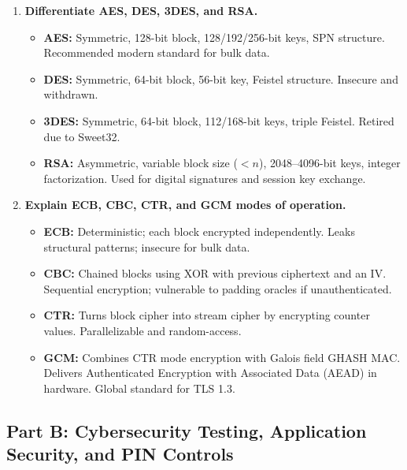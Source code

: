 \begin{enumerate}[label=\textbf{Q\arabic*.},leftmargin=1.2cm]
\item \textbf{Differentiate AES, DES, 3DES, and RSA.}
\begin{itemize}
\item \textbf{AES:} Symmetric, 128-bit block, 128/192/256-bit keys, SPN structure. Recommended modern standard for bulk data.
\item \textbf{DES:} Symmetric, 64-bit block, 56-bit key, Feistel structure. Insecure and withdrawn.
\item \textbf{3DES:} Symmetric, 64-bit block, 112/168-bit keys, triple Feistel. Retired due to Sweet32.
\item \textbf{RSA:} Asymmetric, variable block size ($< n$), 2048--4096-bit keys, integer factorization. Used for digital signatures and session key exchange.
\end{itemize}

\item \textbf{Explain ECB, CBC, CTR, and GCM modes of operation.}
\begin{itemize}
\item \textbf{ECB:} Deterministic; each block encrypted independently. Leaks structural patterns; insecure for bulk data.
\item \textbf{CBC:} Chained blocks using XOR with previous ciphertext and an IV. Sequential encryption; vulnerable to padding oracles if unauthenticated.
\item \textbf{CTR:} Turns block cipher into stream cipher by encrypting counter values. Parallelizable and random-access.
\item \textbf{GCM:} Combines CTR mode encryption with Galois field GHASH MAC. Delivers Authenticated Encryption with Associated Data (AEAD) in hardware. Global standard for TLS 1.3.
\end{itemize}
\end{enumerate}

\subsection{Part B: Cybersecurity Testing, Application Security, and PIN Controls}

